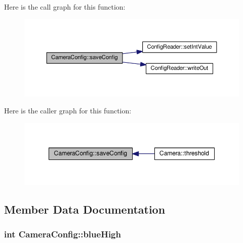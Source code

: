 Here is the call graph for this function\+:\nopagebreak
\begin{figure}[H]
\begin{center}
\leavevmode
\includegraphics[width=350pt]{class_camera_config_a4c686a638a68bfa37b7490ad5fb235f6_cgraph}
\end{center}
\end{figure}




Here is the caller graph for this function\+:\nopagebreak
\begin{figure}[H]
\begin{center}
\leavevmode
\includegraphics[width=348pt]{class_camera_config_a4c686a638a68bfa37b7490ad5fb235f6_icgraph}
\end{center}
\end{figure}




\subsection{Member Data Documentation}
\subsubsection[{\texorpdfstring{blue\+High}{blueHigh}}]{\setlength{\rightskip}{0pt plus 5cm}int Camera\+Config\+::blue\+High}\hypertarget{class_camera_config_a1d3dd499f01ce0b4be38f10c2c314ecb}{}\label{class_camera_config_a1d3dd499f01ce0b4be38f10c2c314ecb}
